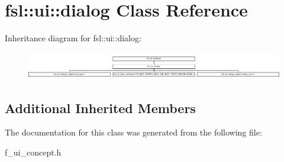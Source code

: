 \hypertarget{classfsl_1_1ui_1_1dialog}{}\section{fsl\+::ui\+::dialog Class Reference}
\label{classfsl_1_1ui_1_1dialog}
Inheritance diagram for fsl\+::ui\+::dialog\+:\begin{figure}[H]
\begin{center}
\leavevmode
\includegraphics[height=1.212121cm]{classfsl_1_1ui_1_1dialog}
\end{center}
\end{figure}
\subsection*{Additional Inherited Members}


The documentation for this class was generated from the following file\+:\begin{DoxyCompactItemize}
\item 
f\+\_\+ui\+\_\+concept.\+h\end{DoxyCompactItemize}
